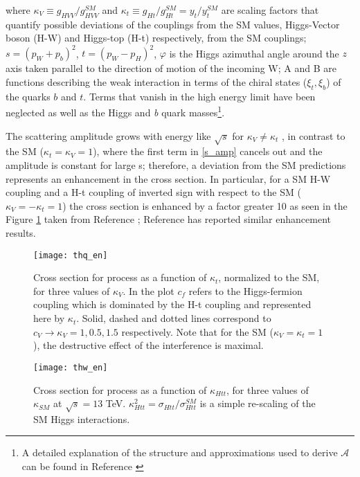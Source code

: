\noindent where $\kappa_V\equiv g_{HVV}/g_{HVV}^{SM}$ and $\kappa_t\equiv g_{Ht}/g_{Ht}^{SM}=y_t/y_t^{SM}$ are scaling factors that quantify possible deviations of the couplings from the SM values, Higgs-Vector boson (H-W) and Higgs-top (H-t) respectively, from the SM couplings; $s=(p_{W}+p_{b})^{2}$, $t=(p_{W}-p_{H})^{2}$, $\varphi$ is the Higgs azimuthal angle around the $z$ axis taken parallel to the direction of motion of the incoming W; A and B are functions describing the weak interaction in terms of the chiral states ($\xi_{t},\xi_{b}$) of the quarks $b$ and $t$. Terms that vanish in the high energy limit have been neglected as well as the Higgs and \textit{b} quark masses\footnote{A detailed explanation of the structure and approximations used to derive $\mathcal{A}$ can be found in Reference \cite{farina}}.

The scattering amplitude grows with energy like $\sqrt{s}$ for $\kappa_V \neq \kappa_t$ , in contrast to the SM ($\kappa_t=\kappa_V=1$), where the first term in \ref{s_amp} cancels out and the amplitude is constant for large s; therefore, a deviation from the SM predictions represents an enhancement in the \tHq cross section. In particular, for a SM H-W coupling and a H-t coupling of inverted sign with respect to the SM ($\kappa_V =-\kappa_t=1$) the \tHq cross section is enhanced by a factor greater 10 as seen in the Figure \ref{thq_en} taken from Reference \cite{farina}; Reference \cite{biswas2} has reported similar enhancement results.

\begin{figure}[h!]
\centering
\texttt{[image: thq\_en]}
\caption[Cross section for \tHq process as a function of $\kappa_t$]{Cross section for \tHq process as a function of $\kappa_t$, normalized to the SM, for three values of $\kappa_V$. In the plot $c_f$ refers to the Higgs-fermion coupling which is dominated by the H-t coupling and represented here by $\kappa_t$. Solid, dashed and dotted lines correspond to $c_V \to \kappa_V= 1, 0.5, 1.5$ respectively. Note that for the SM ($\kappa_V=\kappa_t=1$), the destructive effect of the interference is maximal.} 
\label{thq_en}
\end{figure}

\begin{figure}[h!]
\centering
\texttt{[image: thw\_en]}
\caption[Cross section for \tHW process as a function of $\kappa_{Htt}$]{Cross section for \tHW process as a function of $\kappa_{Htt}$, for three values of $\kappa_{SM}$ at $\sqrt{s}=13$ TeV. $\kappa_{Htt}^2=\sigma_{Htt}/\sigma_{Htt}^{SM}$ is a simple re-scaling of the SM Higgs interactions.} 
\label{thw_en}
\end{figure}

